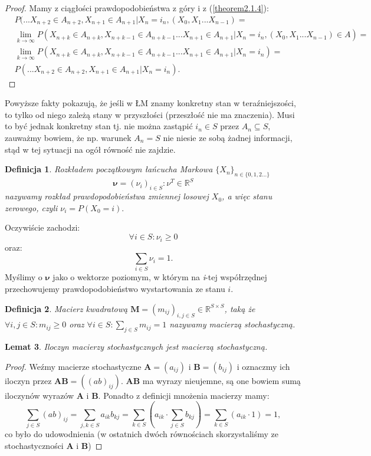 \documentclass[a4paper]{article}
\theoremstyle{defn}
\newtheorem{defn}{Definicja}[subsection]
\theoremstyle{theorem}
\theoremstyle{lemma}
\newtheorem{lemma}[defn]{Lemat}
\theoremstyle{cor}
\theoremstyle{fact}
\begin{document}
\begin{proof}
Mamy z ciągłości prawdopodobieństwa z góry i z (\ref{theorem2.1.4}):
\begin{align*}
&P(...X_{n+2} \in A_{n+2}, X_{n+1} \in A_{n+1}|X_n = i_n, (X_{0}, X_{1} ... X_{n-1}) =\\ &\lim_{k \to \infty} P(X_{n+k} \in A_{n+k}, X_{n+k-1} \in A_{n+k-1}...X_{n+1} \in A_{n+1}|X_n = i_n, (X_{0}, X_{1} ... X_{n-1}) \in A) = \\
&\lim_{k \to \infty} P(X_{n+k} \in A_{n+k}, X_{n+k-1} \in A_{n+k-1}...X_{n+1} \in A_{n+1}|X_n = i_n) = \\
&P(...X_{n+2} \in A_{n+2}, X_{n+1} \in A_{n+1}|X_n = i_n).
\end{align*}
\end{proof}
Powyższe fakty pokazują, że jeśli w ŁM znamy konkretny stan w teraźniejszości, to tylko od niego zależą stany w przyszłości (przeszłość nie ma znaczenia). Musi to być jednak konkretny stan tj. nie można zastąpić $i_n \in S$ przez $A_n \subseteq S$, zauważmy bowiem, że np. warunek $A_n = S$ nie niesie ze sobą żadnej informacji, stąd w tej sytuacji na ogół równość nie zajdzie.
\begin{defn}\label{defn2.1.6}
\textit{Rozkładem początkowym}  łańcucha Markowa $\{X_n\}_{n \in \{0,1,2...\}}$
$$\boldsymbol{\nu} = (\nu_i)_{i \in S}: \nu^T \in \mathbb{R}^S$$
nazywamy rozkład prawdopodobieństwa zmiennej losowej $X_0$, a więc stanu zerowego, czyli $\nu_i = P(X_0 = i).$
\end{defn}
 Oczywiście zachodzi:
 $$\forall i \in S: \nu_i \geq 0$$
 oraz:
 $$\sum\limits_{i \in S}\nu_i = 1.$$
 Myślimy o $\boldsymbol{\nu}$ jako o wektorze poziomym, w którym na \textit{i}-tej współrzędnej przechowujemy prawdopodobieństwo wystartowania ze stanu $i$.
\begin{defn}\label{2.1.7}
Macierz kwadratową $\boldsymbol{M} = (m_{ij})_{i,j \in S} \in \mathbb{R}^{S \times S}$, taką że $\forall i, j \in S: m_{ij} \geq 0$ oraz $\forall i \in S: \sum\limits_{j \in S} m_{ij} = 1$ nazywamy \textit{macierzą stochastyczną}.
\end{defn}
\begin{lemma}\label{lemma2.1.8}
Iloczyn macierzy stochastycznych jest macierzą stochastyczną.
\end{lemma}
\begin{proof}
Weźmy macierze stochastyczne $\boldsymbol{A}=(a_{ij})$ i $\boldsymbol{B}=(b_{ij})$ i oznaczmy ich iloczyn przez $\boldsymbol{AB} = ((ab)_{ij})$. $\boldsymbol{AB}$ ma wyrazy nieujemne, są one bowiem sumą iloczynów wyrazów $\boldsymbol{A}$ i $\boldsymbol{B}$. Ponadto z definicji mnożenia macierzy mamy: $$\sum\limits_{j \in S} (ab)_{ij} = \sum\limits_{j, k \in S} a_{ik}b_{kj} = \sum\limits_{k \in S} (a_{ik} \cdot \sum\limits_{j \in S} b_{kj}) =  \sum\limits_{k \in S} (a_{ik} \cdot 1) = 1,$$ co było do udowodnienia (w ostatnich dwóch równościach skorzystaliśmy ze stochastyczności $\boldsymbol{A}$ i $\boldsymbol{B}$) \end{proof}
\end{document}
